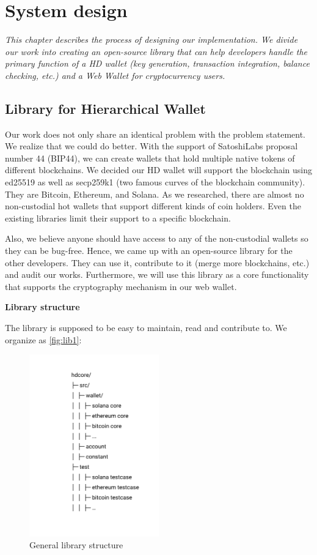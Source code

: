 \chapter{System design}

\textit{This chapter describes the process of designing our implementation. We divide our work into creating an open-source library that can help developers handle the primary function of a HD wallet (key generation, transaction integration, balance checking, etc.) and a Web Wallet for cryptocurrency users. }

\minitoc

\section{Library for Hierarchical Wallet}
Our work does not only share an identical problem with the problem statement. We realize that we could do better. With the support of SatoshiLabs proposal number 44 (BIP44), we can create wallets that hold multiple native tokens of different blockchains. We decided our HD wallet will support the blockchain using ed25519 as well as secp259k1 (two famous curves of the blockchain community). They are Bitcoin, Ethereum, and Solana. As we researched, there are almost no non-custodial hot wallets that support different kinds of coin holders. Even the existing libraries limit their support to a specific blockchain.

Also, we believe anyone should have access to any of the non-custodial wallets so they can be bug-free. Hence, we came up with an open-source library for the other developers. They can use it, contribute to it (merge more blockchains, etc.) and audit our works. Furthermore, we will use this library as a core functionality that supports the cryptography mechanism in our web wallet.

\bigskip
{\textbf{Library structure }}

The library is supposed to be easy to maintain, read and contribute to. We organize as \autoref{fig:lib1}:

\begin{figure}[ht!]
    \centering
    \includegraphics[width=0.5\textwidth]{images/lib_struct.png}
    \caption[General library structure]{General library structure}
    \label{fig:lib1}
\end{figure}

